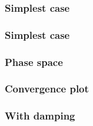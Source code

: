 \documentclass{beamer}
\begin{document}
\begin{frame}
    \frametitle{Simplest case}
\begin{figure}
    \centering
    
\end{figure}
\end{frame}
\begin{frame}
    \frametitle{Simplest case}
\begin{figure}
    \centering
    
\end{figure}
\end{frame}
\begin{frame}
    \frametitle{Phase space}
\begin{figure}
    \centering
    
\end{figure}
\end{frame}

\begin{frame}
    \frametitle{Convergence plot}
\begin{figure}[htbp]
    \centering
    
\end{figure}
\end{frame}

\begin{frame}
    \frametitle{With damping}
    \begin{figure}
    \centering
    
\end{figure}
\end{frame}
\end{document}
